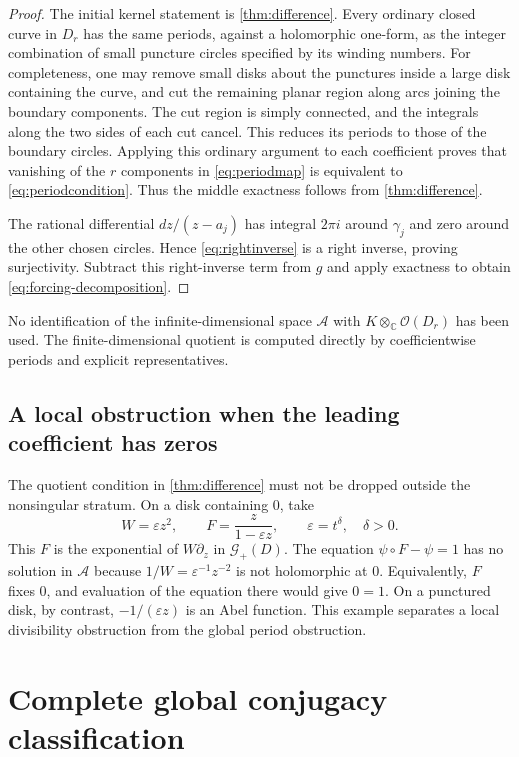 \documentclass[11pt,a4paper]{article}
\numberwithin{equation}{section}
\theoremstyle{definition}
\theoremstyle{remark}
\newcommand{\C}{\mathbb C}
\newcommand{\A}{\mathcal A}
\newcommand{\G}{\mathcal G}
\newcommand{\Oh}{\mathcal O}
\newcommand{\eps}{\varepsilon}
\begin{document}
\begin{proof}
The initial kernel statement is \cref{thm:difference}.  Every ordinary
closed curve in $D_r$ has the same periods, against a holomorphic
one-form, as the integer combination of small puncture circles specified
by its winding numbers.  For completeness, one may remove small disks
about the punctures inside a large disk containing the curve, and cut the
remaining planar region along arcs joining the boundary components.  The
cut region is simply connected, and the integrals along the two sides of
each cut cancel.  This reduces its periods to those of the boundary
circles.  Applying this ordinary argument to each coefficient proves that
vanishing of the $r$ components in \eqref{eq:periodmap} is equivalent to
\eqref{eq:periodcondition}.  Thus the middle exactness follows from
\cref{thm:difference}.

The rational differential $dz/(z-a_j)$ has integral $2\pi i$ around
$\gamma_j$ and zero around the other chosen circles.  Hence
\eqref{eq:rightinverse} is a right inverse, proving surjectivity.  Subtract
this right-inverse term from $g$ and apply exactness to obtain
\eqref{eq:forcing-decomposition}.
\end{proof}

No identification of the infinite-dimensional space $\A$ with
$K\otimes_\C\Oh(D_r)$ has been used.  The finite-dimensional quotient is
computed directly by coefficientwise periods and explicit representatives.

\subsection{A local obstruction when the leading coefficient has zeros}

The quotient condition in \cref{thm:difference} must not be dropped outside
the nonsingular stratum.  On a disk containing $0$, take
\[
 W=\eps z^2,\qquad F=\frac{z}{1-\eps z},
 \qquad\eps=t^\delta,\quad\delta>0.
\]
This $F$ is the exponential of $W\partial_z$ in $\G_+(D)$.
The equation $\psi\circ F-\psi=1$ has no solution in $\A$ because
$1/W=\eps^{-1}z^{-2}$ is not holomorphic at $0$.  Equivalently, $F$ fixes
$0$, and evaluation of the equation there would give $0=1$.
On a punctured disk, by contrast, $-1/(\eps z)$ is an Abel function.
This example separates a local divisibility obstruction from the global
period obstruction.

\section{Complete global conjugacy classification}
\label{sec:classification}
\end{document}
